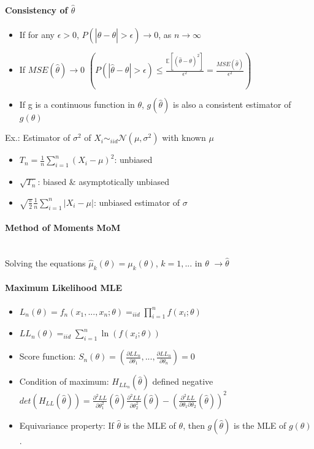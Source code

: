 \documentclass[paper=a4,fontsize=8pt,pagesize,DIV=calc]{scrartcl}
\newcounter{row}
\begin{document}
\begin{multicols}{3}
\paragraph{Consistency of $\hat{\theta}$}
\begin{itemize}
\item If for any $\epsilon >0$, $P(|\hat{\theta}-\theta|>\epsilon)\rightarrow 0$, as $n \rightarrow \infty$
\item If $MSE(\hat{\theta})\rightarrow 0$ $\left(P(|\hat{\theta}-\theta|>\epsilon) \leq \frac{\mathbb{E}[(\hat{\theta}-\theta)^2]}{\epsilon^2}=\frac{MSE(\hat{\theta})}{\epsilon^2}\right)$
\item If g is a continuous function in $\theta$, $g(\hat{\theta})$ is also a consistent estimator of $g(\theta)$
\end{itemize}
Ex.: Estimator of $\sigma^2$ of $X_i\sim_{iid}\mathcal{N}(\mu,\sigma^2)$ with known $\mu$
\begin{itemize}
\item $T_n=\frac{1}{n}\sum^n_{i=1}(X_i-\mu)^2$: unbiased
\item $\sqrt{T_n}$: biased \& asymptotically unbiased
\item $\sqrt{\frac{\pi}{2}}\frac{1}{n}\sum^n_{i=1}|X_i-\mu|$: unbiased estimator of $\sigma$
\end{itemize}
\paragraph{Method of Moments MoM}~~\\
Solving the equations $\hat{\mu}_k(\theta)=\mu_k(\theta)$, $k=1,...$ in $\theta$ $\rightarrow \hat{\theta}$ 
\paragraph{Maximum Likelihood MLE}
\begin{itemize}
\item $L_n(\theta)=f_n(x_1,...,x_n;\theta)=_{iid}\prod^n_{i=1}f(x_i;\theta)$
\item $LL_n(\theta)=_{iid}\sum^n_{i=1}\ln(f(x_i;\theta))$
\item Score function: $S_n(\theta)=(\frac{\partial LL_n}{\partial \theta_1},...,\frac{\partial LL_n}{\partial \theta_n})=0$
\item Condition of maximum: $H_{LL_n}(\hat{\theta})$ defined negative\\
$det(H_{LL}(\hat{\theta}))=\frac{\partial^2 LL}{\partial\theta_1^2}(\hat{\theta})\frac{\partial^2 LL}{\partial\theta_2^2}(\hat{\theta})-\left(\frac{\partial^2 LL}{\partial\theta_1\partial\theta_2}(\hat{\theta})\right)^2$
\item Equivariance property: If $\hat{\theta}$ is the MLE of $\theta$, then $g(\hat{\theta })$ is the MLE of $g(\theta )$.
\end{itemize}

\end{multicols}
\end{document}
